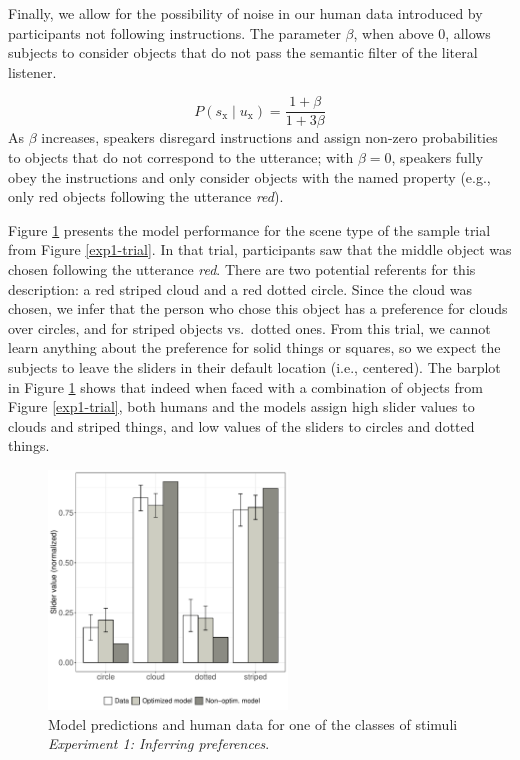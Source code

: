 \documentclass[10pt,a4paper]{article}
\begin{document}

Finally, we allow for the possibility of noise in our human data introduced by participants not following instructions. The parameter $\beta$, when above 0, allows subjects to consider objects that do not pass the semantic filter of the literal listener. 

$$ P(s_{\textrm{x}}\mid u_{\textrm{x}}) = \frac{1 + \beta}{1 + 3\beta}$$
As $\beta$ increases, speakers disregard instructions and assign non-zero probabilities to objects that do not correspond to the utterance; with $\beta = 0$, speakers fully obey the instructions and only consider objects with the named property (e.g., only red objects following the utterance \textit{red}).


Figure \ref{barplot_x4} presents the model performance for the scene type of the sample trial from Figure \ref{exp1-trial}. In that trial, participants saw that the middle object was chosen following the utterance \textit{red}. There are two potential referents for this description: a red striped cloud and a red dotted circle. Since the cloud was chosen, we infer that the person who chose this object has a preference for clouds over circles, and for striped objects vs.~dotted ones. From this trial, we cannot learn anything about the preference for solid things or squares, so we expect the subjects to leave the sliders in their default location (i.e., centered).
The barplot in Figure \ref{barplot_x4} shows that indeed when faced with a combination of objects from Figure \ref{exp1-trial}, both humans and the models assign high slider values to clouds and striped things, and low values of the sliders to circles and dotted things. 

\begin{figure}[ht!]
	\centering
	\includegraphics[width=2.5in]{images/barplot_x4.pdf}
	\caption{Model predictions and human data for one of the classes of stimuli \emph{Experiment 1: Inferring preferences}.}\label{barplot_x4}
\end{figure}
\end{document}
